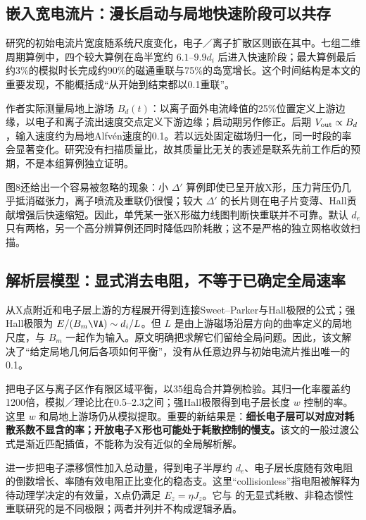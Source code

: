 \documentclass[UTF8,a4paper,11pt,openany,fontset=fandol]{ctexbook}
\begin{document}
\subsection{嵌入宽电流片：漫长启动与局地快速阶段可以共存}
\citet{Shay2004}研究的初始电流片宽度随系统尺度变化，电子／离子扩散区则嵌在其中。七组二维周期算例中，四个较大算例在岛半宽约 $6.1$--$9.9d_i$ 后进入快速阶段；最大算例最后约3\%的模拟时长完成约90\%的磁通重联与75\%的岛宽增长。这个时间结构是本文的重要发现，不能概括成“从开始到结束都以0.1重联”。

作者实际测量局地上游场 $B_d(t)$：以离子面外电流峰值的25\%位置定义上游边缘，以电子和离子流出速度交点定义下游边缘；启动期另作修正。后期 $V_{\rm out}\propto B_d$，输入速度约为局地Alfvén速度的0.1。若以远处固定磁场归一化，同一时段的率会显著变化。研究没有扫描质量比，故其质量比无关的表述是联系先前工作后的预期，不是本组算例独立证明。

图8还给出一个容易被忽略的现象：小 $\Delta'$ 算例即使已呈开放X形，压力背压仍几乎抵消磁张力，离子喷流及重联仍很慢；较大 $\Delta'$ 的长片则在电子片变薄、Hall贡献增强后快速缩短。因此，单凭某一张X形磁力线图判断快重联并不可靠。默认 $d_e$ 只有两格，另一个高分辨算例还同时降低四阶耗散；这不是严格的独立网格收敛扫描。

\subsection{解析层模型：显式消去电阻，不等于已确定全局速率}
\citet{Malyshkin2008}从X点附近和电子层上游的方程展开得到连接Sweet--Parker与Hall极限的公式；强Hall极限为 $E/(B_m\VA)\sim d_i/L$。但 $L$ 是由上游磁场沿层方向的曲率定义的局地尺度，与 $B_m$ 一起作为输入。原文明确把求解它们留给全局问题。因此，该文解决了“给定局地几何后各项如何平衡”，没有从任意边界与初始电流片推出唯一的0.1。

\citet{Simakov2009}把电子区与离子区作有限区域平衡，以35组岛合并算例检验。其归一化率覆盖约1200倍，模拟／理论比在0.5--2.3之间；强Hall极限得到电子层长度 $w$ 控制的率。这里 $w$ 和局地上游场仍从模拟提取。重要的新结果是：\textbf{细长电子层可以对应对耗散系数不显含的率；开放电子X形也可能处于耗散控制的慢支。}该文的一般过渡公式是渐近匹配插值，不能称为没有近似的全局解析解。

\citet{Malyshkin2009}进一步把电子漂移惯性加入总动量，得到电子半厚约 $d_e$、电子层长度随有效电阻的倒数增长、率随有效电阻正比变化的稳态支。这里“collisionless”指电阻被解释为待动理学决定的有效量，X点仍满足 $E_z=\eta J_z$。它与 \citet{Andres2014} 的无显式耗散、非稳态惯性重联研究的是不同极限；两者并列并不构成逻辑矛盾。
\end{document}
